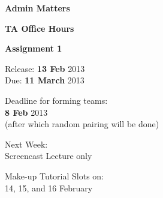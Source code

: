 \begin{cf}{
		\textbf{Admin Matters}
}
\end{cf}

\begin{cf}{
		\textbf{TA Office Hours}
}
\end{cf}

\begin{cf}{
		\textbf{Assignment 1}
}
\end{cf}

\begin{cf}
		Release: \textbf{13 Feb} 2013\\
		Due: \textbf{11 March} 2013
\end{cf}

\begin{cf}
Deadline for forming teams:\\
\textbf{8 Feb} 2013\\
\small (after which random pairing will be done)
\end{cf}

\begin{cf}
Next Week:\\
Screencast Lecture only
\end{cf}

\begin{cf}
Make-up Tutorial Slots on:\\
14, 15, and 16 February
\end{cf}
